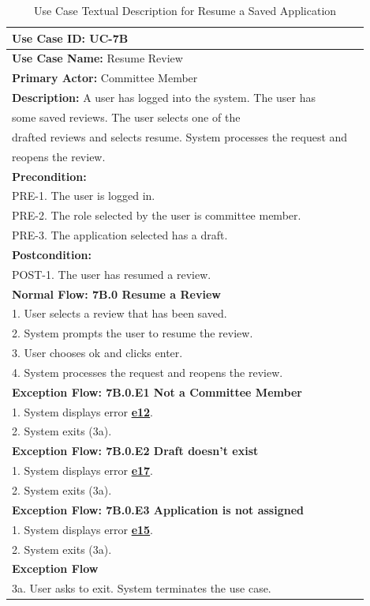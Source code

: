 \documentclass[fontsize=12pt,paper=letter,twoside]{scrartcl}
\begin{document}
\begin{table}[!htb]
\begin{center}
\begin{tabular}{|l|l|}
\hline
\textbf{Use Case ID:} UC-7B \\ \hline
\textbf{Use Case Name:} Resume Review \\ \hline
\textbf {Primary Actor:} Committee Member \\ \hline
\textbf{Description:} A user has logged into the system. The user has \\some saved reviews. The user selects one of the \\drafted reviews and selects resume. System processes the request and \\reopens the review.\\ \hline
\textbf{Precondition:}
\\ PRE-1. The user is logged in.
\\ PRE-2. The role selected by the user is committee member.
\\ PRE-3. The application selected has a draft.\\ \hline
\textbf{Postcondition:}
\\ POST-1. The user has resumed a review. \\ \hline
\textbf{Normal Flow: 7B.0 Resume a Review}
\\ 1. User selects a review that has been saved.
\\ 2. System prompts the user to resume the review.
\\ 3. User chooses ok and clicks enter.
\\ 4. System processes the request and reopens the review.\\ \hline
\textbf{Exception Flow: 7B.0.E1 Not a Committee Member}
\\ 1. System displays error  \hyperref[app:error]{\textbf{e12}}.
\\ 2. System exits (3a). \\ \hline 
\textbf{Exception Flow: 7B.0.E2 Draft doesn't exist}
\\ 1. System displays error  \hyperref[app:error]{\textbf{e17}}.
\\ 2. System exits (3a). \\ \hline 
\textbf{Exception Flow: 7B.0.E3 Application is not assigned}
\\ 1. System displays error \hyperref[app:error]{\textbf{e15}}.
\\ 2. System exits (3a). \\ \hline
\textbf{Exception Flow}
\\ 3a. User asks to exit. System terminates the use case.\\ \hline
\end{tabular}
\end{center}
\caption {Use Case Textual Description for Resume a Saved Application}
\label{tbl:uc7Btd}
\end{table}
\end{document}
